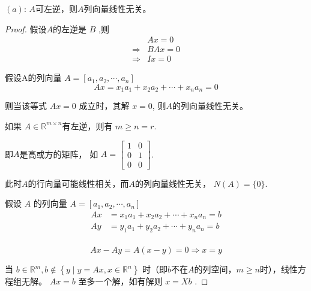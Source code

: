 \begin{theorem}
    $(a)$: $A$可左逆，则$A$列向量线性无关。
\end{theorem}

\begin{proof}
    假设$A$的左逆是 $ B $ ,则
    \begin{equation}
    \begin{aligned}
            & A x=0 \\
     \Rightarrow &B A x=0 \\
    \Rightarrow & I x=0
    \end{aligned}
    \end{equation}

    假设A的列向量 $ A=\left[a_{1}, a_{2}, \cdots, a_{n}\right] $
    \begin{equation}
    A x=x_{1} a_{1}+x_{2} a_{2}+\cdots+x_{n} a_{n}=0
    \end{equation}

    则当该等式 $ A x=0 $ 成立时，其解 $ x=0 $, 则$A$的列向量线性无关。  
    
    \begin{corollary}
        如果 $ A \in \mathbb{R}^{m \times n} $有左逆，则有 $ m \geq n = r $. 

    即$A$是高或方的矩阵， 如 $ A=\left[\begin{array}{ll}1 & 0 \\ 0 & 1 \\ 0 & 0\end{array}\right] $. 
    
    此时$A$的行向量可能线性相关，而$A$的列向量线性无关， $N(A) = \{0\}$.
    \end{corollary}
    

    假设 $ A $ 的列向量 $ A=\left[a_{1}, a_{2}, \cdots, a_{n}\right] $
    \begin{equation}
    \begin{aligned}
         A x&=x_{1} a_{1}+x_{2} a_{2}+\cdots+x_{n} a_{n}=b \\
    A y&=y_{1} a_{1}+y_{2} a_{2}+\cdots+y_{n} a_{n}=b \\
    \end{aligned}
    \end{equation}

    \begin{equation}A x-A y=A(x-y)=0 \Rightarrow x=y\end{equation}

    当 $ b \in \mathbb{R}^{m}, b \notin\left\{y \mid y=A x, x \in \mathbb{R}^{n}\right\} $ 时（即$b$不在$A$的列空间，$ m \geq n  $时），线性方程组无解。  $ A x=b $ 至多一个解，如有解则 $ x=X b $ . 
\end{proof}


